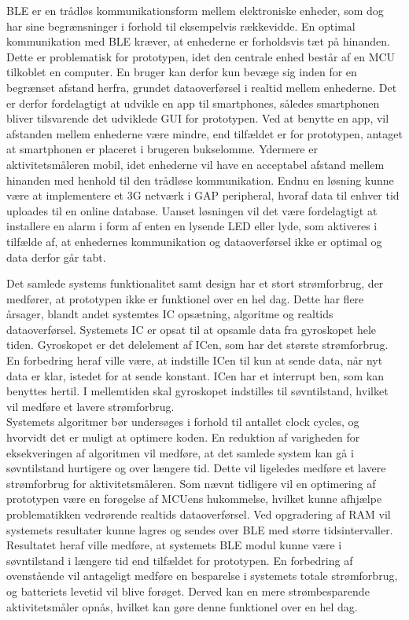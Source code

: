 BLE er en trådløs kommunikationsform mellem elektroniske enheder, som dog har sine begrænsninger i forhold til eksempelvis rækkevidde. En optimal kommunikation med BLE kræver, at enhederne er forholdsvis tæt på hinanden. Dette er problematisk for prototypen, idet den centrale enhed består af en MCU tilkoblet en computer. En bruger kan derfor kun bevæge sig inden for en begrænset afstand herfra, grundet dataoverførsel i realtid mellem enhederne. Det er derfor fordelagtigt at udvikle en app til smartphones, således smartphonen bliver tilsvarende det udviklede GUI for prototypen. Ved at benytte en app, vil afstanden mellem enhederne være mindre, end tilfældet er for prototypen, antaget at smartphonen er placeret i brugeren bukselomme. Ydermere er aktivitetsmåleren mobil, idet enhederne vil have en acceptabel afstand mellem hinanden med henhold til den trådløse kommunikation. Endnu en løsning kunne være at implementere et 3G netværk i GAP peripheral, hvoraf data til enhver tid uploades til en online database. Uanset løsningen vil det være fordelagtigt at installere en alarm i form af enten en lysende LED eller lyde, som aktiveres i tilfælde af, at enhedernes kommunikation og dataoverførsel ikke er optimal og data derfor går tabt. 

Det samlede systems funktionalitet samt design har et stort strømforbrug, der medfører, at prototypen ikke er funktionel over en hel dag. Dette har flere årsager, blandt andet systemtes IC opsætning, algoritme og realtids dataoverførsel. Systemets IC er opsat til at opsamle data fra gyroskopet hele tiden. Gyroskopet er det delelement af ICen, som har det største strømforbrug. En forbedring heraf ville være, at indstille ICen til kun at sende data, når nyt data er klar, istedet for at sende konstant. ICen har et interrupt ben, som kan benyttes hertil. I mellemtiden skal gyroskopet indstilles til søvntilstand, hvilket vil medføre et lavere strømforbrug. \\
Systemets algoritmer bør undersøges i forhold til antallet clock cycles, og hvorvidt det er muligt at optimere koden. En reduktion af varigheden for eksekveringen af algoritmen vil medføre, at det samlede system kan gå i søvntilstand hurtigere og over længere tid. Dette vil ligeledes medføre et lavere strømforbrug for aktivitetsmåleren. Som nævnt tidligere vil en optimering af prototypen være en forøgelse af MCUens hukommelse, hvilket kunne afhjælpe problematikken vedrørende realtids dataoverførsel. Ved opgradering af RAM vil systemets resultater kunne lagres og sendes over BLE med større tidsintervaller. Resultatet heraf ville medføre, at systemets BLE modul kunne være i søvntilstand i længere tid end tilfældet for prototypen. En forbedring af ovenstående vil antageligt medføre en besparelse i systemets totale strømforbrug, og batteriets levetid vil blive forøget. Derved kan en mere strømbesparende aktivitetsmåler opnås, hvilket kan gøre denne funktionel over en hel dag.

